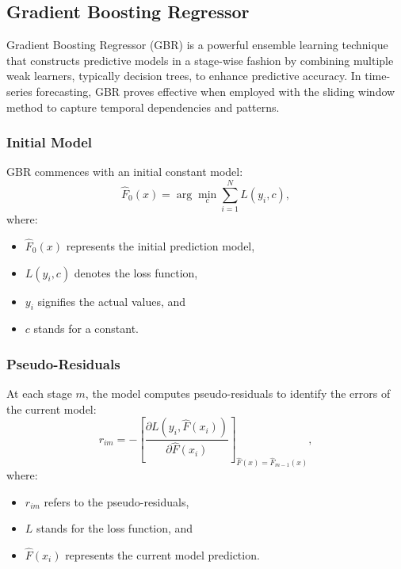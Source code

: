 \documentclass{ieeeojies}
\begin{document}
\subsection{Gradient Boosting Regressor}

Gradient Boosting Regressor (GBR) is a powerful ensemble learning technique that constructs predictive models in a stage-wise fashion by combining multiple weak learners, typically decision trees, to enhance predictive accuracy. In time-series forecasting, GBR proves effective when employed with the sliding window method to capture temporal dependencies and patterns.

\subsubsection{Initial Model}

GBR commences with an initial constant model:
\begin{equation}
    \hat{F}_0(x) = \arg\min_{c} \sum_{i=1}^{N} L(y_i, c),
\end{equation}
where:
\begin{itemize}
    \item \(\hat{F}_0(x)\) represents the initial prediction model,
    \item \(L(y_i, c)\) denotes the loss function,
    \item \(y_i\) signifies the actual values, and
    \item \(c\) stands for a constant.
\end{itemize}

\subsubsection{Pseudo-Residuals}

At each stage \(m\), the model computes pseudo-residuals to identify the errors of the current model:
\begin{equation}
    r_{im} = -\left[\frac{\partial L(y_i, \hat{F}(x_i))}{\partial \hat{F}(x_i)}\right]_{\hat{F}(x) = \hat{F}_{m-1}(x)},
\end{equation}
where:
\begin{itemize}
    \item \(r_{im}\) refers to the pseudo-residuals,
    \item \(L\) stands for the loss function, and
    \item \(\hat{F}(x_i)\) represents the current model prediction.
\end{itemize}
\end{document}
